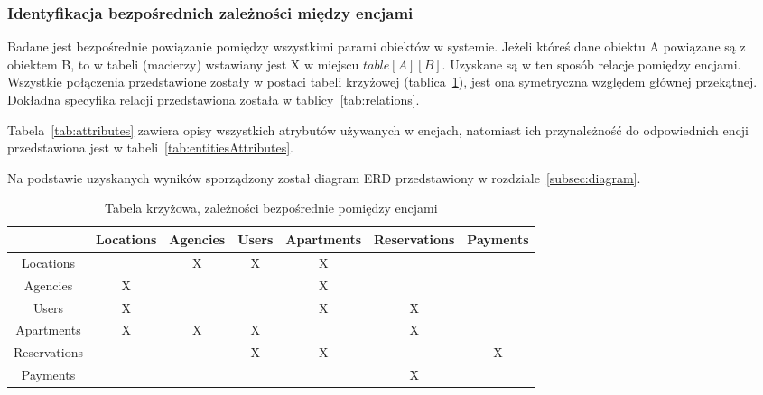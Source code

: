 \documentclass[polish, 11pt]{article}
\begin{document}
        \subsubsection{Identyfikacja bezpośrednich zależności między encjami}
            Badane jest bezpośrednie powiązanie pomiędzy wszystkimi parami obiektów w systemie.
            Jeżeli któreś dane obiektu A powiązane są z obiektem B, to w tabeli (macierzy) wstawiany jest X w miejscu \(table[A][B]\).
            Uzyskane są w ten sposób relacje pomiędzy encjami.
            Wszystkie połączenia przedstawione zostały w postaci tabeli krzyżowej (tablica~\ref{tab:cross}),
            jest ona symetryczna względem głównej przekątnej.
            Dokładna specyfika relacji przedstawiona została w tablicy~\ref{tab:relations}.

            Tabela~\ref{tab:attributes} zawiera opisy wszystkich atrybutów używanych w encjach,
            natomiast ich przynależność do odpowiednich encji przedstawiona jest w tabeli~\ref{tab:entitiesAttributes}.

            Na podstawie uzyskanych wyników sporządzony został diagram ERD przedstawiony w rozdziale~\ref{subsec:diagram}.
            
            \begin{table}[h]
                \centering
                \caption{Tabela krzyżowa, zależności bezpośrednie pomiędzy encjami}\label{tab:cross}
                \begin{tabular}{ccccccc}\toprule
                    &	Locations	&	Agencies	&	Users	&	Apartments	&	Reservations	&	Payments	\\\midrule
                    Locations	    &		&	X	&	X	&	X	&		&		\\
                    Agencies	    &	X	&		&		&	X	&		&		\\
                    Users	        &	X	&		&		&	X	&	X	&		\\
                    Apartments	    &	X	&	X	&	X	&		&	X	&		\\
                    Reservations	&		&		&	X	&	X	&		&	X	\\
                    Payments	    &		&		&		&		&	X	&		\\
                \bottomrule
                \end{tabular}
            \end{table}
\end{document}
